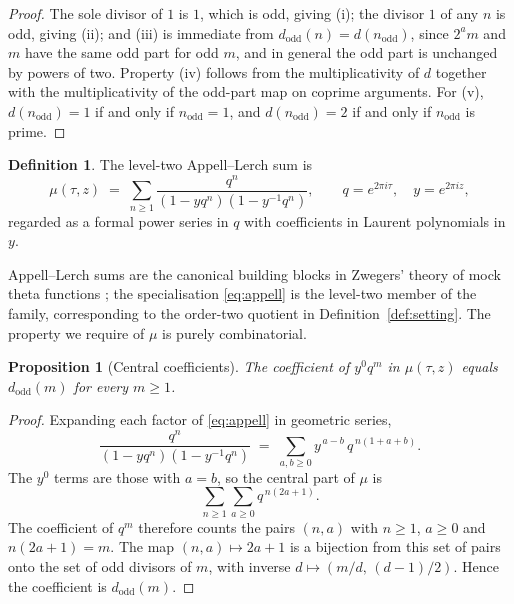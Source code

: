 \documentclass[11pt,a4paper]{article}
\newcommand{\dodd}{d_{\mathrm{odd}}}
\theoremstyle{plain}
\newtheorem{proposition}[theorem]{Proposition}
\theoremstyle{definition}
\newtheorem{definition}[theorem]{Definition}
\theoremstyle{remark}
\begin{document}
\begin{proof}
The sole divisor of $1$ is $1$, which is odd, giving (i); the divisor
$1$ of any $n$ is odd, giving (ii); and (iii) is immediate from
$\dodd(n) = d(n_{\mathrm{odd}})$, since $2^a m$ and $m$ have the same
odd part for odd $m$, and in general the odd part is unchanged by
powers of two. Property (iv) follows from the multiplicativity of $d$
together with the multiplicativity of the odd-part map on coprime
arguments. For (v), $d(n_{\mathrm{odd}}) = 1$ if and only if
$n_{\mathrm{odd}} = 1$, and $d(n_{\mathrm{odd}}) = 2$ if and only if
$n_{\mathrm{odd}}$ is prime.
\end{proof}

\begin{definition}\label{def:appell}
The level-two Appell--Lerch sum is
\begin{equation}\label{eq:appell}
  \mu(\tau,z) \;=\; \sum_{n \ge 1} \frac{q^n}{(1 - yq^n)(1 - y^{-1}q^n)},
  \qquad q = e^{2\pi i\tau},\quad y = e^{2\pi i z},
\end{equation}
regarded as a formal power series in $q$ with coefficients in
Laurent polynomials in $y$.
\end{definition}

Appell--Lerch sums are the canonical building blocks in Zwegers'
theory of mock theta functions \cite{Zwegers}; the specialisation
\eqref{eq:appell} is the level-two member of the family,
corresponding to the order-two quotient in
Definition~\ref{def:setting}. The property we require of $\mu$ is
purely combinatorial.

\begin{proposition}[Central coefficients]\label{prop:appell}
The coefficient of $y^0 q^m$ in $\mu(\tau,z)$ equals $\dodd(m)$ for
every $m \ge 1$.
\end{proposition}

\begin{proof}
Expanding each factor of \eqref{eq:appell} in geometric series,
\[
  \frac{q^n}{(1 - yq^n)(1 - y^{-1}q^n)}
  \;=\; \sum_{a,b \ge 0} y^{\,a-b}\, q^{\,n(1+a+b)} .
\]
The $y^0$ terms are those with $a = b$, so the central part of $\mu$
is
\[
  \sum_{n \ge 1} \sum_{a \ge 0} q^{\,n(2a+1)} .
\]
The coefficient of $q^m$ therefore counts the pairs $(n,a)$ with
$n \ge 1$, $a \ge 0$ and $n(2a+1) = m$. The map $(n,a) \mapsto 2a+1$
is a bijection from this set of pairs onto the set of odd divisors of
$m$, with inverse $d \mapsto (m/d,\, (d-1)/2)$. Hence the coefficient
is $\dodd(m)$.
\end{proof}
\end{document}
